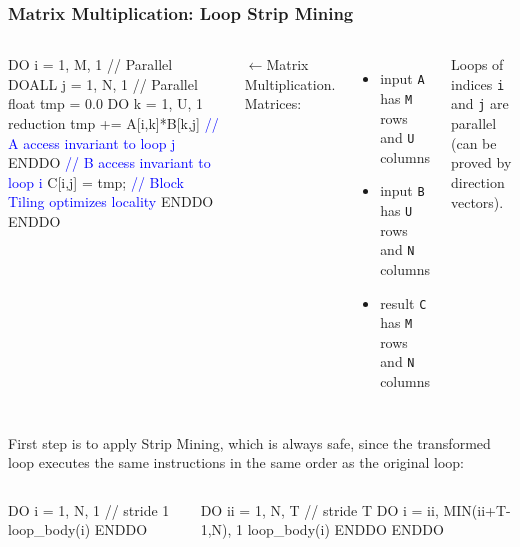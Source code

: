 \documentclass{beamer}
\newcommand{\blue}[1]{\textcolor{Blue}{{#1}}}
\newcommand{\emp}[1]{\textcolor{DikuRed}{ #1}}
\newcommand{\emphh}[1]{\textcolor{CosGreen}{ #1}}
\begin{document}
\begin{frame}[fragile,t]
  \frametitle{Matrix Multiplication: Loop Strip Mining} %

\begin{columns}
\begin{colorcode}[fontsize=\scriptsize]
DO i = 1, M, 1   \emphh{// Parallel}
  DOALL j = 1, N, 1  \emphh{// Parallel}
    float tmp = 0.0
    DO k = 1, U, 1 \emp{reduction}
      tmp += A[i,k]*B[k,j]    \blue{// A access invariant to loop j}
    ENDDO                     \blue{// B access invariant to loop i}
    C[i,j] = tmp;             \blue{// Block Tiling optimizes locality}
  ENDDO
ENDDO
\end{colorcode}
$\leftarrow$Matrix Multiplication. Matrices:\smallskip
\begin{itemize}
    \item input {\tt A} has {\tt M} rows and {\tt U} columns
    \item input {\tt B} has {\tt U} rows and {\tt N} columns
    \item result {\tt C} has {\tt M} rows and {\tt N} columns 
\end{itemize}
\medskip

Loops of indices {\tt i} and {\tt j} are parallel
(can be proved by direction vectors).
\end{columns}
\bigskip

First step is to apply Strip Mining, which is always safe, since 
the transformed loop executes the same instructions in the same 
order as the original loop:\medskip

\begin{columns}
\begin{colorcode}[fontsize=\scriptsize]
DO i = 1, N, 1  // stride 1
  loop_body(i)
ENDDO


\end{colorcode}
\begin{colorcode}[fontsize=\scriptsize]
DO ii = 1, N, T            // stride T
  DO i = ii, MIN(ii+T-1,N), 1 
    loop_body(i)
  ENDDO
ENDDO
\end{colorcode}
\end{columns}
\end{frame}
\end{document}
